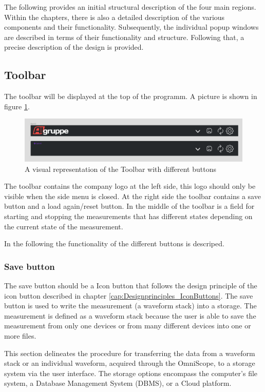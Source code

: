 \documentclass{scrreprt}
\begin{document}
The following provides an initial structural description of the four main regions. Within the chapters, there is also a detailed description of the various components and their functionality. Subsequently, 
the individual popup windows are described in terms of their functionality and structure. Following that, a precise description of the design is provided.


\subsection{Toolbar}

The toolbar will be displayed at the top of the programm. 
A picture is shown in figure \ref{fig: toolbar}. 
\begin{figure}
    \includegraphics[width=.9\textwidth]{assets/pictures/Toolbar states.png}
    \caption[]{A visual representation of the Toolbar with different buttons}
    \label{fig: toolbar}
\end{figure}
The toolbar contains the company logo at the left side, this logo should only be visible when the side menu is closed. 
At the right side the toolbar contains a save button and a load again/reset button. 
In the middle of the toolbar is a field for starting and stopping the measurements that has different states depending on the current state of the measurement. 

In the following the functionality of the different buttons is descriped. 

\subsubsection{Save button}

The save button should be a Icon button that follows the design principle of the icon button described in chapter \ref{cap:Designprinciples_IconButtons}. 
The save button is used to write the measurement (a waveform stack) into a storage. 
The measurement is defined as a waveform stack because the user is able to save the measurement from only one devices or from many different devices into one or more files.

This section delineates the procedure for transferring the data from a waveform stack or an individual waveform, acquired through the OmniScope, to a storage system via the user interface. The storage options encompass the computer's file system, a Database Management System (DBMS), or a Cloud platform.
\\
\end{document}
